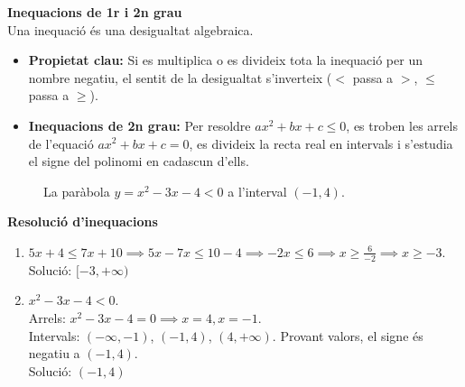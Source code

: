 \documentclass[12pt]{article}
\begin{document}
\begin{concept}
\textbf{Inequacions de 1r i 2n grau}\\
Una inequació és una desigualtat algebraica.
\begin{itemize}
    \item \textbf{Propietat clau:} Si es multiplica o es divideix tota la inequació per un nombre negatiu, el sentit de la desigualtat s'inverteix ($<$ passa a $>$, $\le$ passa a $\ge$).
    \item \textbf{Inequacions de 2n grau:} Per resoldre $ax^2 + bx + c \le 0$, es troben les arrels de l'equació $ax^2 + bx + c = 0$, es divideix la recta real en intervals i s'estudia el signe del polinomi en cadascun d'ells.
\end{itemize}

\begin{figure}[H]
\centering
{}
\caption{La paràbola \(y=x^2-3x-4<0\) a l'interval \((-1,4)\).}
\end{figure}

\end{concept}

\begin{exemple}
\textbf{Resolució d'inequacions}
\begin{enumerate}[label=\alph*)]
    \item $5x + 4 \le 7x + 10 \implies 5x - 7x \le 10 - 4 \implies -2x \le 6 \implies x \ge \frac{6}{-2} \implies x \ge -3$. \\
    Solució: $[-3, +\infty)$
    \item $x^2 - 3x - 4 < 0$. \\
    Arrels: $x^2 - 3x - 4 = 0 \implies x = 4, x = -1$. \\
    Intervals: $(-\infty, -1)$, $(-1, 4)$, $(4, +\infty)$. Provant valors, el signe és negatiu a $(-1, 4)$. \\
    Solució: $(-1, 4)$
\end{enumerate}
\end{exemple}
\end{document}
